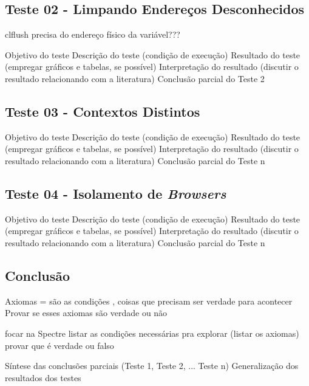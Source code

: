 \documentclass[
	article,			    %
	12pt,				    %
	oneside,			    %
	a4paper,			    %
	chapter=TITLE,		    %
	section=TITLE,		    %
	subsection=TITLE,	    %
	english,			    %
	brazil,				    %
	sumario=tradicional
]{abntex2}
\begin{document}
\subsection{Teste 02 - Limpando Endereços Desconhecidos}

clflush precisa do endereço físico da variável???

Objetivo do teste
Descrição do teste (condição de execução)
Resultado do teste (empregar gráficos e tabelas, se possível)
Interpretação do resultado (discutir o resultado relacionando com a literatura)
Conclusão parcial do Teste 2

\subsection{Teste 03 - Contextos Distintos}
Objetivo do teste
Descrição do teste (condição de execução)
Resultado do teste (empregar gráficos e tabelas, se possível)
Interpretação do resultado (discutir o resultado relacionando com a literatura)
Conclusão parcial do Teste n

\subsection{Teste 04 - Isolamento de \emph{Browsers}}
Objetivo do teste
Descrição do teste (condição de execução)
Resultado do teste (empregar gráficos e tabelas, se possível)
Interpretação do resultado (discutir o resultado relacionando com a literatura)
Conclusão parcial do Teste n

\subsection{Conclusão}

Axiomas = são as condições , coisas que precisam ser verdade para acontecer
Provar se esses axiomas são verdade ou não

focar na Spectre
listar as condições necessárias pra explorar (listar os axiomas)
provar que é verdade ou falso

Síntese das conclusões parciais (Teste 1, Teste 2, ... Teste n)
Generalização dos resultados dos testes
\end{document}
